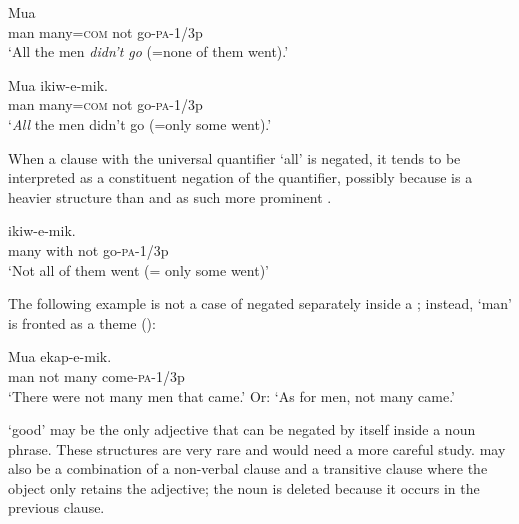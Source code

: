 \ea%
\label{ex:x669}
\gll Mua      \\
man  many=\textsc{com}  not  go-\textsc{pa}-1/3p\\
\glt `All the men \textit{didn't go} (=none of them went).'
\z

\ea%
\label{ex:x671}
\gll Mua     ikiw-e-mik. \\
man  many=\textsc{com}  not  go-\textsc{pa}-1/3p\\
\glt `\textit{All} the men didn't go (=only some went).'
\z

When a clause with the universal quantifier  `all' is negated, it tends to be interpreted as a constituent negation of the quantifier, possibly because  is a heavier structure than  and as such more prominent .

\ea%
\label{ex:x668}
\gll {}      ikiw-e-mik. \\
many  with  not  go-\textsc{pa}-1/3p\\
\glt `Not all of them went (= only some went)'
\z

The following example is not a case of  negated separately inside a ; instead,  `man' is fronted as a theme ():

\ea%
\label{ex:x1150}
\gll Mua      ekap-e-mik. \\
man  not  many  come-\textsc{pa}-1/3p\\
\glt `There were not many men that came.' Or: `As for men, not many came.'
\z

 `good' may be the only adjective that can be negated by itself inside a noun phrase. These structures are very rare and would need a more careful study.  may also be a combination of a non-verbal clause and a transitive clause where the object  only retains the adjective; the noun is deleted because it occurs in the previous clause.

